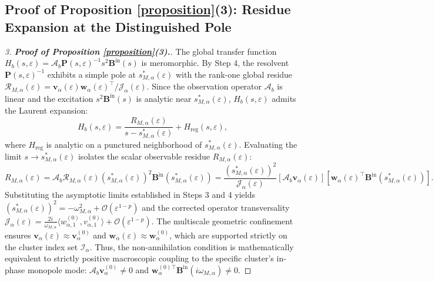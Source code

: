 \documentclass[11pt,a4paper]{article}
\numberwithin{equation}{section}
\begin{document}
\subsection{Proof of Proposition \ref{proposition}(3): Residue Expansion at the Distinguished Pole}

\begin{proof}[3. \textbf{Proof of Proposition \ref{proposition}(3).}]
    
\medskip
\noindent
The global transfer function $H_b(s, \varepsilon) = \mathcal{A}_b \mathbf{P}(s, \varepsilon)^{-1} s^2 \mathbf{B}^{\text{in}}(s)$ is meromorphic. By Step 4, the resolvent $\mathbf{P}(s, \varepsilon)^{-1}$ exhibits a simple pole at $s_{M, \alpha}^\ast(\varepsilon)$ with the rank-one global residue $\mathcal{R}_{M, \alpha}(\varepsilon) = \mathbf{v}_\alpha(\varepsilon) \mathbf{w}_\alpha(\varepsilon)^\top / \mathcal{J}_\alpha(\varepsilon)$. Since the observation operator $\mathcal{A}_b$ is linear and the excitation $s^2 \mathbf{B}^{\text{in}}(s)$ is analytic near $s_{M, \alpha}^\ast(\varepsilon)$, $H_b(s, \varepsilon)$ admits the Laurent expansion:
\begin{equation}
    H_b(s, \varepsilon) = \frac{R_{M, \alpha}(\varepsilon)}{s - s_{M, \alpha}^\ast(\varepsilon)} + H_{\mathrm{reg}}(s, \varepsilon),
\end{equation}
where $H_{\mathrm{reg}}$ is analytic on a punctured neighborhood of $s_{M, \alpha}^\ast(\varepsilon)$. Evaluating the limit $s \to s_{M, \alpha}^\ast(\varepsilon)$ isolates the scalar observable residue $R_{M, \alpha}(\varepsilon)$:
\begin{equation}
    R_{M, \alpha}(\varepsilon) = \mathcal{A}_b \mathcal{R}_{M, \alpha}(\varepsilon) (s_{M, \alpha}^\ast(\varepsilon))^2 \mathbf{B}^{\text{in}}(s_{M, \alpha}^\ast(\varepsilon)) = \frac{(s_{M, \alpha}^\ast(\varepsilon))^2}{\mathcal{J}_\alpha(\varepsilon)} \left[ \mathcal{A}_b \mathbf{v}_\alpha(\varepsilon) \right] \left[ \mathbf{w}_\alpha(\varepsilon)^\top \mathbf{B}^{\text{in}}(s_{M, \alpha}^\ast(\varepsilon)) \right].
\end{equation}
Substituting the asymptotic limits established in Steps 3 and 4 yields $(s_{M, \alpha}^\ast(\varepsilon))^2 = -\omega_{M,\alpha}^2 + \mathcal{O}(\varepsilon^{1-p})$ and the corrected operator transversality $\mathcal{J}_\alpha(\varepsilon) = \frac{2i}{\omega_{M,\alpha}} \langle w_{\alpha, 1}^{(0)}, v_{\alpha, 1}^{(0)} \rangle + \mathcal{O}(\varepsilon^{1-p})$. The multiscale geometric confinement ensures $\mathbf{v}_\alpha(\varepsilon) \approx \mathbf{v}_\alpha^{(0)}$ and $\mathbf{w}_\alpha(\varepsilon) \approx \mathbf{w}_\alpha^{(0)}$, which are supported strictly on the cluster index set $\mathcal{I}_\alpha$. Thus, the non-annihilation condition is mathematically equivalent to strictly positive macroscopic coupling to the specific cluster's in-phase monopole mode: $\mathcal{A}_b \mathbf{v}_\alpha^{(0)} \neq 0$ and $\mathbf{w}_\alpha^{(0)\top} \mathbf{B}^{\text{in}}(i\omega_{M,\alpha}) \neq 0$. 

\end{proof}
\end{document}
